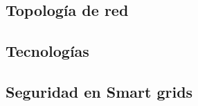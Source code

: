 



\subsection{Topología de red}



\subsection{Tecnologías}










\subsection{Seguridad en Smart grids}





